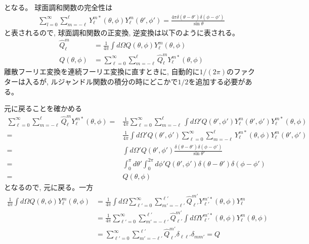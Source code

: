 \documentclass[a4j, 12pt]{ltjarticle}
\begin{document}
    となる。
    球面調和関数の完全性は
    \begin{align}
        \sum_{l=0}^{\infty} \sum_{m=-\ell}^{\ell} Y_\ell^{m*}(\theta,\phi)
        Y_\ell^m(\theta',\phi') = \frac{4\pi\delta(\theta - \theta')\delta(\phi - \phi')}{\sin\theta}
    \end{align}
    と表されるので, 球面調和関数の正変換, 逆変換は以下のように表される。
    \begin{align}
        \widehat{Q}_\ell^m &= 
        \frac{1}{4\pi}\int d\Omega Q(\theta,\phi) Y_\ell^m(\theta,\phi) \nonumber\\
        Q(\theta,\phi) &=\sum_{\ell=0}^\infty \sum_{m=-\ell}^\ell \widehat{Q}_\ell^m 
        Y_\ell^{m*}(\theta,\phi)
    \end{align}
    離散フーリエ変換を連続フーリエ変換に直すときに, 自動的に$1/(2\pi)$のファクターは入るが, ルジャンドル関数の積分の時にどこかで$1/2$を追加する必要がある。
    \par
    元に戻ることを確かめる
    \begin{align}
        \sum_{\ell=0}^\infty \sum_{m=-\ell}^\ell \widehat{Q}_\ell^m 
        Y_\ell^{m*}(\theta,\phi) =&
        \frac{1}{4\pi}\sum_{\ell=0}^\infty \sum_{m=-\ell}^\ell  \int d\Omega' Q(\theta',\phi') Y_\ell^m(\theta',\phi')
        Y_\ell^{m*}(\theta,\phi) \nonumber\\
        =& \frac{1}{4\pi}\int d\Omega' Q(\theta',\phi') \sum_{\ell=0}^\infty
        \sum_{m=-\ell}^\ell  Y_\ell^{m*}(\theta,\phi)
        Y_\ell^m(\theta',\phi') \nonumber\\
        =& \int d\Omega' Q(\theta',\phi')\frac{\delta(\theta-\theta')\delta(\phi-\phi')}{\sin\theta'} \nonumber\\
        =& \int_0^\pi d\theta' \int_0^{2\pi} d\phi'Q(\theta',\phi')\delta(\theta-\theta')\delta(\phi-\phi') \nonumber\\
        =& Q(\theta,\phi)
    \end{align}
    となるので, 元に戻る。一方
    \begin{align}
        \frac{1}{4\pi}\int d\Omega Q(\theta,\phi)Y_\ell^m(\theta,\phi)
        &= \frac{1}{4\pi}\int d\Omega\sum_{\ell'=0}^\infty \sum_{m'=-\ell'}^{\ell'} \widehat{Q}_{\ell'}^{m'}
        Y_{\ell'}^{m'*}(\theta,\phi) Y_\ell^m \nonumber\\
        &= \frac{1}{4\pi}\sum_{\ell'=0}^\infty \sum_{m'=-\ell'}^{\ell'} \widehat{Q}_{\ell'}^{m'}
        \int d\Omega Y_{\ell'}^{m'*}(\theta,\phi) Y_\ell^m(\theta,\phi) \nonumber\\
        &=\sum_{\ell'=0}^\infty \sum_{m'=-\ell'}^{\ell'} \widehat{Q}_{\ell'}^{m'}
        \delta_{\ell\ell'}\delta_{mm'} = Q
    \end{align}
    
\end{document}
